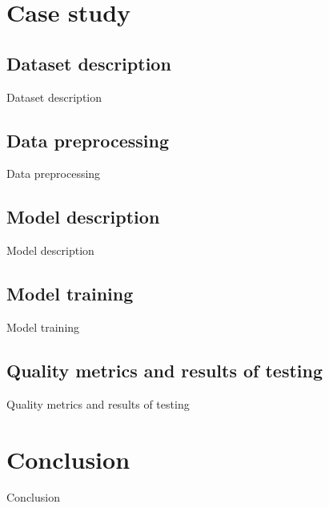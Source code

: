 \documentclass{article}
\begin{document}
\section{Case study}

\subsection{Dataset description}
Dataset description

\subsection{Data preprocessing}
Data preprocessing

\subsection{Model description}
Model description

\subsection{Model training}
Model training

\subsection{Quality metrics and results of testing}
Quality metrics and results of testing

\section{Conclusion}
Conclusion


\end{document}
